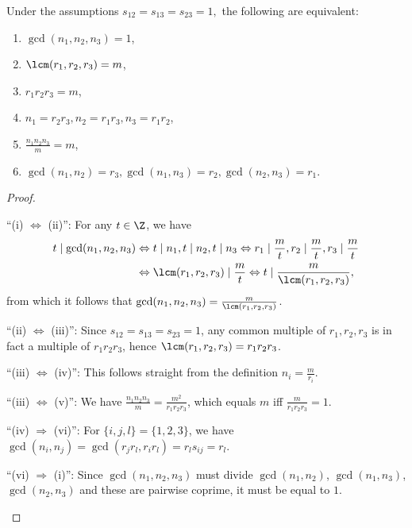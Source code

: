 \begin{lemma}\label{TFAE5}
Under the assumptions $s_{12}=s_{13}=s_{23}=1,$ the following are equivalent:
\begin{enumerate}%
\item $\gcd(n_1,n_2,n_3)=1$,
\item $\lcm(r_1,r_2,r_3)=m$,
\item $r_1r_2r_3=m$,
\item $n_1=r_2r_3, n_2=r_1r_3, n_3=r_1r_2$,
\item $\frac{n_1n_2n_3}{m}=m$,
\item $\gcd(n_1,n_2)=r_3, \gcd(n_1,n_3)=r_2, \gcd(n_2,n_3)=r_1$.
\end{enumerate}
\end{lemma}
\begin{proof}
\leavevmode
\begin{DESCRIPTION}%
\item[\enquote{(i) $\Leftrightarrow$ (ii)}:] For any $t\in\Z$, we have
\begin{align*}
t \mid \gcd(n_1,n_2,n_3) &\Leftrightarrow t \mid n_1, t\mid n_2, t\mid n_3 \Leftrightarrow r_1\mid \frac{m}{t}, r_2\mid \frac{m}{t}, r_3\mid \frac{m}{t} \\&\Leftrightarrow \lcm(r_1,r_2,r_3)\mid \frac{m}{t} \Leftrightarrow t \mid \frac{m}{ \lcm(r_1,r_2,r_3)},
\end{align*}
from which it follows that $ \gcd(n_1,n_2,n_3)=\frac{m}{ \lcm(r_1,r_2,r_3)}$.
\item[\enquote{(ii) $\Leftrightarrow$ (iii)}:]   Since $s_{12}=s_{13}=s_{23}=1$, any common multiple of $r_1,r_2,r_3$ is in fact a multiple of $r_1r_2r_3$, hence $\lcm(r_1,r_2,r_3)=r_1r_2r_3$.
\item[\enquote{(iii) $\Leftrightarrow$ (iv)}:] This follows straight from the definition $n_i=\frac{m}{r_i}$.
\item[\enquote{(iii) $\Leftrightarrow$ (v)}:] We have $\frac{n_1n_2n_3}{m}=\frac{m^2}{r_1r_2r_3}$, which equals $m$ iff $\frac{m}{r_1r_2r_3}=1$.
\item[\enquote{(iv) $\Rightarrow$ (vi)}:] For $\{i,j,l\}=\{1,2,3\}$, we have $\gcd(n_i,n_j)=\gcd(r_jr_l,r_ir_l)=r_ls_{ij}=r_l$.
\item[\enquote{(vi) $\Rightarrow$ (i)}:] Since $\gcd(n_1,n_2,n_3)$ must divide $\gcd(n_1,n_2)$, $\gcd(n_1,n_3)$, $\gcd(n_2,n_3)$ and these are pairwise coprime, it must be equal to $1$.
\end{DESCRIPTION}
\end{proof}


